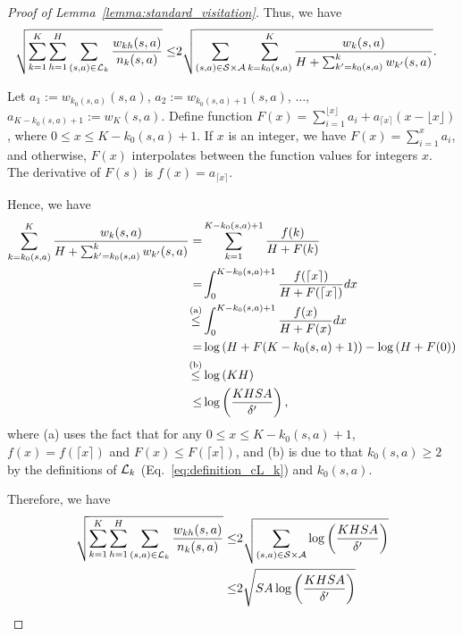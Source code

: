 \begin{proof}[Proof of Lemma~\ref{lemma:standard_visitation}]
	Thus, we have
	\begin{align*}
		\sqrt{\sum_{k=1}^{K} \sum_{h=1}^{H} \sum_{(s,a) \in \mathcal{L}_k} \frac{w_{kh}(s,a)}{n_k(s,a)}} \leq & 2 \sqrt{ \sum_{(s,a) \in \mathcal{S} \times \mathcal{A}} \sum_{k=k_0(s,a)}^{K} \frac{w_{k}(s,a)}{ H + \sum_{k'=k_0(s,a)}^{k} w_{k'}(s,a) } } .
	\end{align*}
	
	Let $a_1:=w_{k_0(s,a)}(s,a)$, $a_2:=w_{k_0(s,a)+1}(s,a)$, $\dots$, $a_{K-k_0(s,a)+1}:=w_{K}(s,a)$. Define function $F(x)=\sum_{i=1}^{\lfloor x \rfloor} a_i + a_{\lceil x \rceil} (x - \lfloor x \rfloor)$, where $0 \leq x \leq K-k_0(s,a)+1$. If $x$ is an integer, we have $F(x)=\sum_{i=1}^{x} a_i$, and otherwise, $F(x)$ interpolates between the function values for integers $x$. The derivative of $F(s)$ is $f(x)=a_{\lceil x \rceil}$.
	
	Hence, we have 
	\begin{align*}
		\sum_{k=k_0(s,a)}^{K} \frac{w_{k}(s,a)}{ H + \sum_{k'=k_0(s,a)}^{k} w_{k'}(s,a) } = & \sum_{k=1}^{K-k_0(s,a)+1} \frac{f(k)}{ H + F(k) } 
		\\
		= & \int_{0}^{K-k_0(s,a)+1} \frac{f(\lceil x \rceil)}{ H + F(\lceil x \rceil) } dx  
		\\
		\overset{\textup{(a)}}{\leq} & \int_{0}^{K-k_0(s,a)+1} \frac{f(x)}{ H + F(x) } dx  
		\\
		= & \log\left(  H+F(K-k_0(s,a)+1)  \right) - \log\left(  H+F(0)  \right)
		\\
		\overset{\textup{(b)}}{\leq} & \log\left(  KH  \right)
		\\
		\leq & \log \left( \frac{KHSA}{\delta'} \right) ,
	\end{align*}
	where (a) uses the fact that for any $0 \leq x \leq K-k_0(s,a)+1$, $f(x)=f(\lceil x \rceil)$ and $F(x) \leq F(\lceil x \rceil)$, and (b) is due to that $k_0(s,a) \geq 2$ by the definitions of $\mathcal{L}_k$ (Eq.~\eqref{eq:definition_cL_k}) and $k_0(s,a)$.
	
	Therefore, we have
	\begin{align*}
		\sqrt{\sum_{k=1}^{K} \sum_{h=1}^{H} \sum_{(s,a) \in \mathcal{L}_k} \frac{w_{kh}(s,a)}{n_k(s,a)}} \leq & 2 \sqrt{ \sum_{(s,a) \in \mathcal{S} \times \mathcal{A}} \log \left( \frac{KHSA}{\delta'} \right) }
		\\
		\leq & 2 \sqrt{ SA \log \left( \frac{KHSA}{\delta'} \right) }
	\end{align*}
\end{proof}


